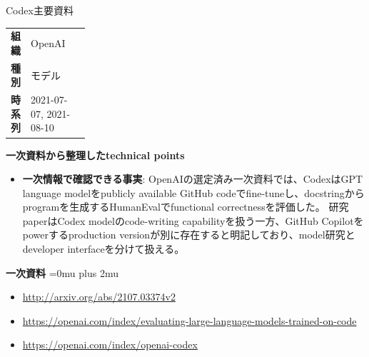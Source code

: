 \begin{technicalnote}{Codex}{主要資料}
\begingroup
\begin{tabularx}{\linewidth}{@{}>{\bfseries}p{0.22\linewidth}X@{}}
組織 & OpenAI \\
種別 & モデル \\
時系列 & 2021-07-07, 2021-08-10 \\
\end{tabularx}
\smallskip
{\bfseries 一次資料から整理したtechnical points}
\begin{itemize}[leftmargin=1.5em,itemsep=0.35em]
\item \textbf{一次情報で確認できる事実}: OpenAIの選定済み一次資料では、CodexはGPT language modelをpublicly available GitHub codeでfine-tuneし、docstringからprogramを生成するHumanEvalでfunctional correctnessを評価した。 研究paperはCodex modelのcode-writing capabilityを扱う一方、GitHub Copilotをpowerするproduction versionが別に存在すると明記しており、model研究とdeveloper interfaceを分けて扱える。
\end{itemize}
\begin{minipage}{\linewidth}
\begin{samepage}
{\bfseries 一次資料}
\begingroup\sloppy
\Urlmuskip=0mu plus 2mu\relax
\begin{itemize}[leftmargin=1.5em,itemsep=0.25em]
\item {\scriptsize\url{http://arxiv.org/abs/2107.03374v2}}
\item {\scriptsize\url{https://openai.com/index/evaluating-large-language-models-trained-on-code}}
\item {\scriptsize\url{https://openai.com/index/openai-codex}}
\end{itemize}
\endgroup
\end{samepage}
\end{minipage}
\endgroup
\end{technicalnote}
\medskip

